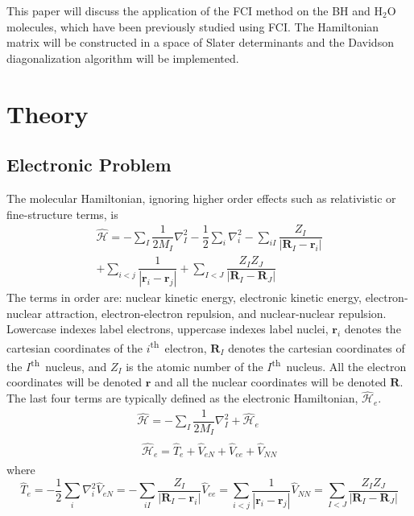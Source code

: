 \documentclass[final,3p,times,twocolumn]{elsarticle}
\newcommand{\ssth}{\textsuperscript{th}}
\newcommand{\ham}{\hat{\mathcal{H}}}
\begin{document}
This paper will discuss the application of the FCI method on the BH and H$_2$O molecules, which have been previously studied using FCI.\cite{cccbdb,handy-1983} The Hamiltonian matrix will be constructed in a space of Slater determinants and the Davidson diagonalization algorithm will be implemented. 

\section{Theory}
\subsection{Electronic Problem} \label{sec:elproblem}
The molecular Hamiltonian, ignoring higher order effects such as relativistic or fine-structure terms, is
\begin{equation}
\begin{gathered}
\hat{\mathcal H} = - \sum_I \dfrac{1}{2M_I} \nabla_I^2 -\dfrac{1}{2} \sum_i \nabla_i^2 - \sum_{iI} \dfrac{Z_I}{|\mathbf{R}_I - \mathbf{r}_i|} \\
+ \sum_{i < j} \dfrac{1}{|\mathbf{r}_i - \mathbf{r}_j|} + \sum_{I < J} \dfrac{Z_IZ_J}{|\mathbf{R}_I - \mathbf{R}_J|}
\end{gathered}
\end{equation}
The terms in order are: nuclear kinetic energy, electronic kinetic energy, electron-nuclear attraction, electron-electron repulsion, and nuclear-nuclear repulsion. Lowercase indexes label electrons, uppercase indexes label nuclei, $\mathbf{r}_i$ denotes the cartesian coordinates of the $i$\ssth\ electron, $\mathbf{R}_I$ denotes the cartesian coordinates of the $I$\ssth\ nucleus, and $Z_I$ is the atomic number of the $I$\ssth\ nucleus. All the electron coordinates will be denoted $\mathbf{r}$ and all the nuclear coordinates will be denoted $\mathbf{R}$. The last four terms are typically defined as the electronic Hamiltonian, $\ham_e$.
\begin{gather}
\hat{\mathcal H} = - \sum_I \dfrac{1}{2M_I} \nabla_I^2 + \ham_e \\
\begin{gathered}\label{eq:hame}
\ham_e = \hat T_e + \hat V_{eN} + \hat V_{ee} + \hat V_{NN} 
\end{gathered}
\end{gather}
where
\begin{subequations}
\begin{equation}
\hat T_e = -\dfrac{1}{2} \sum_i \nabla_i^2 
\end{equation}
\begin{equation}
\hat V_{eN} = - \sum_{iI} \dfrac{Z_I}{|\mathbf{R}_I - \mathbf{r}_i|}
\end{equation}
\begin{equation}
\hat V_{ee} = \sum_{i < j} \dfrac{1}{|\mathbf{r}_i - \mathbf{r}_j|}
\end{equation}
\begin{equation} \label{eq:vnn}
\hat V_{NN} = \sum_{I < J} \dfrac{Z_IZ_J}{|\mathbf{R}_I - \mathbf{R}_J|}
\end{equation}
\end{subequations}
\end{document}
